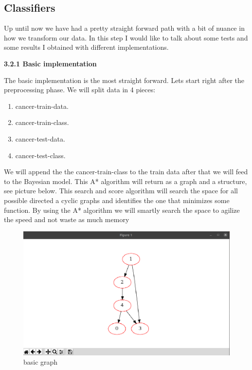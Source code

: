 \documentclass{article} %
\begin{document}
\subsection{Classifiers}
Up until now we have had a pretty straight forward path with a bit of nuance in how we transform our data. In this step I would like to talk about some tests and some results I obtained with different implementations.
\bigskip
\begin{normalsize}
\textbf{3.2.1   Basic implementation}
\end{normalsize}
The basic implementation is the most straight forward. Lets start right after the preprocessing phase. We will split data in 4 pieces:
\bigskip
\begin{enumerate} 
 \item cancer-train-data.
 
 \item cancer-train-class.
 
 \item cancer-test-data.
 
 \item cancer-test-class.
 
  
\end{enumerate}
\bigskip
We will append the the cancer-train-class to the train data after that we will feed to the Bayesian model. This A* algorithm will return as a graph and a structure, see picture below. This search and score algorithm will search the space for all possible directed a cyclic graphs and identifies the one that minimizes some function. By using the A* algorithm we will smartly search the space to agilize the speed and not waste as much memory
\bigskip
\begin{figure}[h!]
  \includegraphics[width=\linewidth]{basic-graph.png}
  \caption{basic graph}
  \label{fig:basic graph}
\end{figure}
\end{document}

